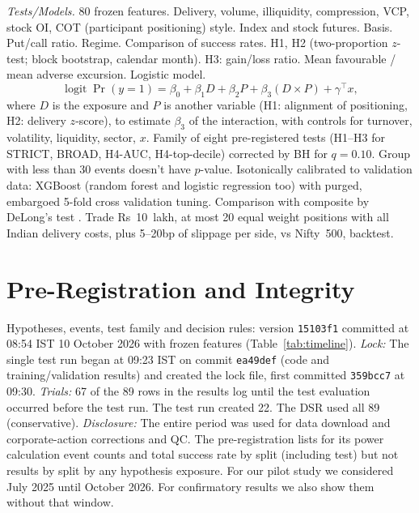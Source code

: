 \documentclass[conference]{IEEEtran}
\begin{document}
\emph{Tests/Models.} 80 frozen features. Delivery, volume, illiquidity, compression, VCP, stock OI, COT
(participant positioning) style. Index and stock futures. Basis. Put/call ratio. Regime. Comparison of success
rates. H1, H2 (two-proportion $z$-test; block bootstrap, calendar month). H3: gain/loss ratio. Mean favourable /
mean adverse excursion. Logistic model.
\begin{equation}
\operatorname{logit}\Pr(y=1)=\beta_0+\beta_1 D+\beta_2 P+\beta_3 (D\times P)+\gamma^{\top}x,
\label{eq:logit}
\end{equation}
where $D$ is the exposure and $P$ is another variable (H1: alignment of positioning, H2: delivery
$z$-score), to estimate $\beta_3$ of the interaction, with controls for turnover, volatility, liquidity, sector,
$x$. Family of eight pre-registered tests (H1--H3 for STRICT, BROAD, H4-AUC, H4-top-decile) corrected by BH for
$q=0.10$. Group with less than 30 events doesn't have $p$-value. Isotonically calibrated to validation data:
XGBoost (random forest and logistic regression too) with purged, embargoed 5-fold cross validation tuning.
Comparison with composite by DeLong's test \cite{delong1988}. Trade Rs~10~lakh, at most 20 equal weight
positions with all Indian delivery costs, plus 5--20bp of slippage per side, vs Nifty~500, backtest.

\section{Pre-Registration and Integrity}\label{sec:prereg}
Hypotheses, events, test family and decision rules: version \texttt{15103f1} committed at 08:54 IST 10
October 2026 with frozen features (Table~\ref{tab:timeline}). \emph{Lock:} The single test run began at 09:23
IST on commit \texttt{ea49def} (code and training/validation results) and created the lock file, first
committed \texttt{359bcc7} at 09:30. \emph{Trials:} 67 of the 89 rows in the results log until the test
evaluation occurred before the test run. The test run created 22. The DSR used all 89 (conservative).
\emph{Disclosure:} The entire period was used for data download and corporate-action corrections and QC. The
pre-registration lists for its power calculation event counts and total success rate by split (including test)
but not results by split by any hypothesis exposure. For our pilot study we considered July 2025 until October
2026. For confirmatory results we also show them without that window.
\end{document}
